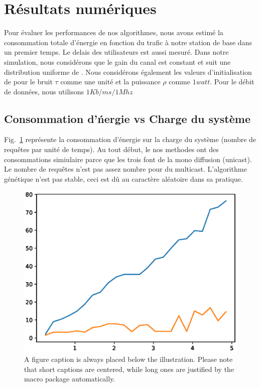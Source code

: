 \documentclass[runningheads]{llncs}
\begin{document}
\section{R\'esultats num\'eriques}
Pour évaluer les performances de nos algorithmes, nous avons estimé la 
consommation totale d'énergie en fonction du trafic à notre station de 
base dans un premier temps. Le delais des utilisateurs est aussi mesur\'e.
Dans notre simulation, nous considérons que le gain du canal est constant 
et suit une distribution uniforme de \cite{huang2016}.
Nous considérons également les valeurs d'initialisation de \cite{huang2016} 
pour le bruit $ \tau $ comme une unité et la puissance $ \rho $ comme 
$ 1 watt $. Pour le débit de données, nous utilisons $1Kb/ms/1Mhz$

\subsection{Consommation d'\'nergie vs Charge du syst\`eme}
Fig.~\ref{fig:evslm4} repr\'esente la consommation d'énergie sur 
la charge du système (nombre de requêtes par unit\'e de temps).
Au tout début, le nos methodes ont des consommations simiulaire parce que les
trois font de la mono diffusion (unicast). Le nombre de requêtes n'est pas 
assez nombre pour du multicast.
L'algorithme g\'en\'etique n'est pas stable, ceci est dû au caract\`ere 
aléatoire dans sa pratique.
\begin{figure}[H]
    
    \includegraphics[width=\textwidth]{EvsL.eps}
    \caption{A figure caption is always placed below the illustration.
    Please note that short captions are centered, while long ones are
    justified by the macro package automatically.} 
    \label{fig:evslm4}
\end{figure}
\end{document}
